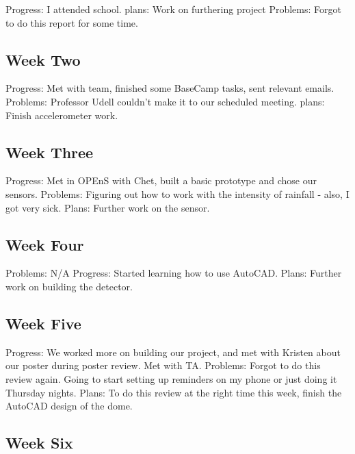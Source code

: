 \documentclass[letterpaper,10pt,draftclsnofoot,onecolumn]{article}
\begin{document}
Progress: I attended school.
\newline
plans: Work on furthering project
\newline
Problems: Forgot to do this report for some time.

\subsection{Week Two}

Progress: Met with team, finished some BaseCamp tasks, sent relevant emails.
\newline
Problems: Professor Udell couldn’t make it to our scheduled meeting.
\newline
plans: Finish accelerometer work.

\subsection{Week Three}

Progress: Met in OPEnS with Chet, built a basic prototype and chose our sensors.
\newline
Problems: Figuring out how to work with the intensity of rainfall - also, I got very sick.
\newline
Plans: Further work on the sensor.

\subsection{Week Four}

Problems: N/A
\newline
Progress: Started learning how to use AutoCAD.
\newline
Plans: Further work on building the detector.

\subsection{Week Five}

Progress: We worked more on building our project, and met with Kristen about our poster during poster review. Met with TA.
\newline
Problems: Forgot to do this review again. Going to start setting up reminders on my phone or just doing it Thursday nights.
\newline
Plans: To do this review at the right time this week, finish the AutoCAD design of the dome.

\subsection{Week Six}
\end{document}
